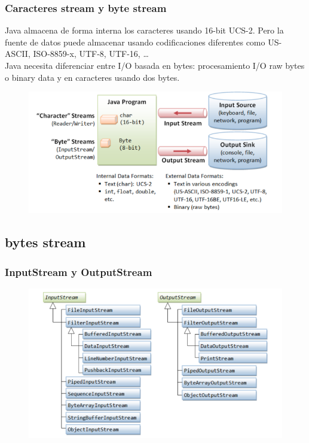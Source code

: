 \documentclass{beamer}
\begin{document}
\begin{frame}[fragile]
\frametitle{Caracteres stream y byte stream}
Java almacena de forma interna los caracteres usando 16-bit  UCS-2. Pero la fuente de datos puede almacenar usando codificaciones diferentes como US-ASCII, ISO-8859-x, UTF-8, UTF-16, \dots\\
Java necesita diferenciar entre I/O basada en \alert{bytes}: procesamiento I/O raw bytes o binary data y en \alert{caracteres} usando dos bytes.\\
\begin{figure}
\includegraphics[scale=0.5]{imagenes/stream.png}
\end{figure}
\end{frame}

\subsection{bytes stream}
\begin{frame}
\frametitle{InputStream y OutputStream}
\begin{figure}
\includegraphics[scale=0.6]{imagenes/io.png}
\end{figure}
\end{frame}
\end{document}
